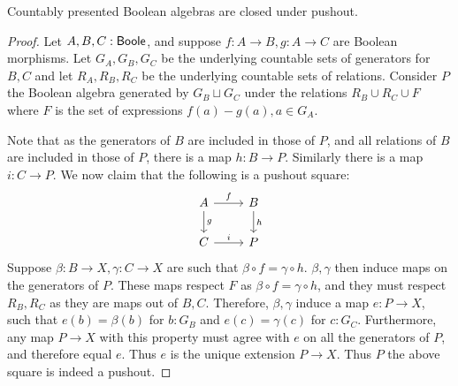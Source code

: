 \begin{lemma}\label{BoolePushouts}
  Countably presented Boolean algebras are closed under pushout. 
\end{lemma} 
\begin{proof}
  Let $A,B,C:\mathsf{Boole}$, and suppose $f:A\to B, g:A \to C$ are Boolean morphisms. 
  Let $G_A, G_B,G_C$ be the underlying countable sets of generators for $B,C$ and 
  let $R_A,R_B,R_C$ be the underlying countable sets of relations. 
  Consider $P$ the Boolean algebra generated by $G_B\sqcup G_C$ under the relations 
  $R_B\cup R_C \cup F$ where $F$ is the set of expressions $f(a)-g(a), a\in G_A$.
  
  Note that as the generators of $B$ are included in those of $P$, 
  and all relations of $B$ are included in those of $P$, there is a map $h:B\to P$. 
  Similarly there is a map $i:C\to P$. 
  We now claim that the following is a pushout square:
  \begin{equation}\begin{tikzcd}
    A \arrow[r,"f"] \arrow[d,"g"] & B \arrow[d,"h"]\\
    C \arrow[r,"i"] & P
  \end{tikzcd}\end{equation}  
  Suppose $\beta:B \to X, \gamma:C\to X$ are such that $\beta\circ f = \gamma \circ h$. 
  $\beta,\gamma$ then induce maps on the generators of $P$. 
  These maps respect $F$ as $\beta\circ f=\gamma\circ h$, and they must respect $R_B,R_C$ as they are maps out of $B,C$. 
  Therefore, $\beta,\gamma$ induce a map $e:P\to X$, such that 
  $e(b) = \beta(b)$ for $b:G_B$ and $e(c)=\gamma(c)$ for $c:G_C$. 
  Furthermore, any map $P\to X$ with this property must agree with $e$ on all the generators of $P$, 
  and therefore equal $e$. Thus $e$ is the unique extension $P\to X$. 
  Thus $P$ the above square is indeed a pushout. 
\end{proof}


